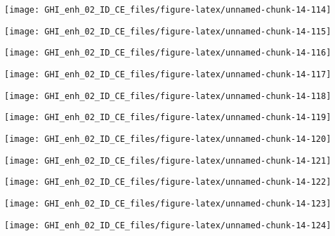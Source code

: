 \documentclass[
  10pt,
  a4paper,oneside]{article}
\begin{document}
\begin{center}\texttt{[image: GHI\_enh\_02\_ID\_CE\_files/figure-latex/unnamed-chunk-14-114]} \end{center}

\begin{center}\texttt{[image: GHI\_enh\_02\_ID\_CE\_files/figure-latex/unnamed-chunk-14-115]} \end{center}

\begin{center}\texttt{[image: GHI\_enh\_02\_ID\_CE\_files/figure-latex/unnamed-chunk-14-116]} \end{center}

\begin{center}\texttt{[image: GHI\_enh\_02\_ID\_CE\_files/figure-latex/unnamed-chunk-14-117]} \end{center}

\begin{center}\texttt{[image: GHI\_enh\_02\_ID\_CE\_files/figure-latex/unnamed-chunk-14-118]} \end{center}

\begin{center}\texttt{[image: GHI\_enh\_02\_ID\_CE\_files/figure-latex/unnamed-chunk-14-119]} \end{center}

\begin{center}\texttt{[image: GHI\_enh\_02\_ID\_CE\_files/figure-latex/unnamed-chunk-14-120]} \end{center}

\begin{center}\texttt{[image: GHI\_enh\_02\_ID\_CE\_files/figure-latex/unnamed-chunk-14-121]} \end{center}

\begin{center}\texttt{[image: GHI\_enh\_02\_ID\_CE\_files/figure-latex/unnamed-chunk-14-122]} \end{center}

\begin{center}\texttt{[image: GHI\_enh\_02\_ID\_CE\_files/figure-latex/unnamed-chunk-14-123]} \end{center}

\begin{center}\texttt{[image: GHI\_enh\_02\_ID\_CE\_files/figure-latex/unnamed-chunk-14-124]} \end{center}
\end{document}
